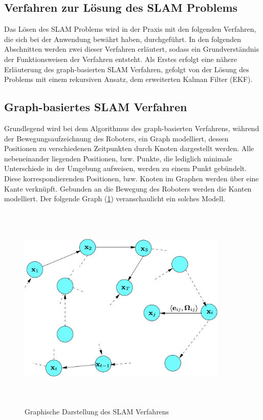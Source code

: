 \subsection{Verfahren zur Lösung des SLAM Problems}
Das Lösen des \acs{SLAM} Problems wird in der Praxis mit den folgenden Verfahren, die sich bei der Anwendung bewährt haben, durchgeführt. In den 
folgenden Abschnitten werden zwei dieser Verfahren erläutert, sodass ein Grundverständnis der Funktionsweisen der Verfahren entsteht. 
Als Erstes erfolgt eine nähere Erläuterung des graph-basierten \acs{SLAM} Verfahren, gefolgt von der Lösung des Problems mit einem rekursiven 
Ansatz, dem erweiterten Kalman Filter (\acs{EKF}).

\subsection*{Graph-basiertes SLAM Verfahren}
Grundlegend wird bei dem Algorithmus des graph-basierten Verfahrens, während der Bewegungsaufzeichnung des Roboters, ein Graph modelliert, 
dessen Positionen zu verschiedenen Zeitpunkten durch Knoten dargestellt werden. Alle nebeneinander liegenden Positionen, bzw. Punkte, die 
lediglich minimale Unterschiede in der Umgebung aufweisen, werden zu einem Punkt gebündelt. Diese korrespondierenden Positionen, bzw. 
Knoten im Graphen werden über eine Kante verknüpft. Gebunden an die Bewegung des Roboters werden die Kanten modelliert. Der folgende Graph 
(\ref{pic:GraphSLAM}) veranschaulicht ein solches Modell.
\begin{figure}[hbt!]
    \centering
    \includegraphics[width=10cm,height=10cm,keepaspectratio]{2Grundlagen/Bilder/graph_SLAM.png}
    \caption{Graphische Darstellung des SLAM Verfahrens \cite{graphSLAM.2010}}
    \label{pic:GraphSLAM}
\end{figure}

